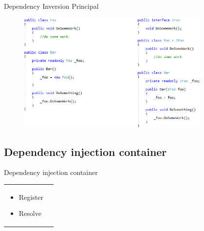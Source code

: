 \documentclass{beamer}
\begin{document}
\begin{frame}{Dependency Inversion Principal}
\begin{figure}
	\begin{center}
  		\includegraphics[height=6cm]{PresentationDIP.png}
	\end{center}
\end{figure}
\end{frame}

\subsection*{Dependency injection container}

\begin{frame}{Dependency injection container}
\begin{table}
     \begin{Large}
	\begin{tabular}{ p{6cm} p{6cm} }
		\begin{minipage}{.6\textwidth}
			\begin{itemize}
				\item Register
				\item Resolve
			\end{itemize}
   		 \end{minipage}
   		 &
	\end{tabular}
     \end{Large}
\end{table}
\end{frame}
\end{document}
